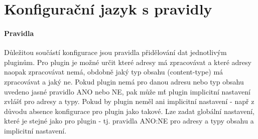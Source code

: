 \documentclass[10pt]{article}
\begin{document}
\section{Konfigura\v{c}n\'i jazyk s pravidly}
\paragraph{Pravidla}D\r{u}le\v{z}itou sou\v{c}\'ast\'i konfigurace jsou pravidla p\v{r}id\v{e}lov\'an\'i dat jednotliv\'ym plugin\r{u}m. Pro plugin je mo\v{z}n\'e ur\v{c}it kter\'e adresy m\'a zpracov\'avat a kter\'e adresy naopak zpracov\'avat nem\'a, obdobn\v{e} jak\'y typ obsahu (content-type) m\'a zpracov\'avat a jak\'y ne. Pokud plugin nem\'a pro danou adresu nebo typ obsahu uvedeno jasn\'e pravidlo ANO nebo NE, pak m\r{u}\v{z}e m\'t plugin implicitn\'i nastaven\'i zvl\'a\v{s}\v{t} pro adresy a typy. Pokud by plugin nem\v{e}l ani implicitn\'i nastaven\'i - nap\v{r} z d\r{u}vodu absence konfigurace pro plugin jako takov\'e. Lze zadat glob\'aln\'i nastaven\'i, kter\'e je stejn\'e jako pro plugin - tj. pravidla ANO:NE pro adresy a typy obsahu a implicitn\'i nastaven\'i.
\end{document}
